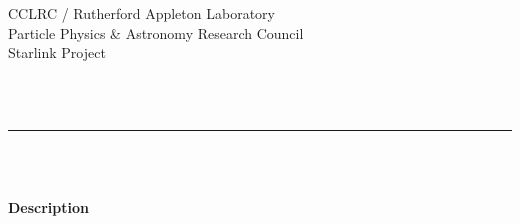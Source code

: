 \begin{latexonly}
   CCLRC / {\sc Rutherford Appleton Laboratory} \hfill {\bf \stardocname}\\
   {\large Particle Physics \& Astronomy Research Council}\\
   {\large Starlink Project\\}
   {\large \stardoccategory\ \stardocnumber}
   \begin{flushright}
   \stardocauthors\\
   \stardocdate
   \end{flushright}
   \vspace{-4mm}
   \rule{\textwidth}{0.5mm}
   \vspace{5mm}
   \begin{center}
   {\Huge\bf  \stardoctitle \\ [2.5ex]}
   {\LARGE\bf \stardocversion \\ [4ex]}
   {\Huge\bf  \stardocmanual}
   \end{center}
   \vspace{5mm}

   \vspace{10mm}
   \begin{center}
      {\Large\bf Description}
   \end{center}

\end{latexonly}

